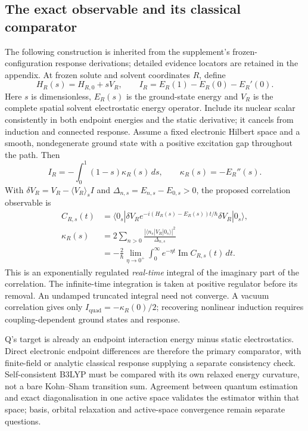 \documentclass{article}
\begin{document}
\subsection{The exact observable and its classical comparator}

The following construction is inherited from the supplement's frozen-configuration response derivations; detailed evidence locators are retained in the appendix. At frozen solute and solvent coordinates $R$, define
\begin{equation*}
H_R(s)=H_{R,0}+sV_R,\qquad I_R=E_R(1)-E_R(0)-E_R'(0).
\end{equation*}
Here $s$ is dimensionless, $E_R(s)$ is the ground-state energy and $V_R$ is the complete spatial solvent electrostatic energy operator. Include its nuclear scalar consistently in both endpoint energies and the static derivative; it cancels from induction and connected response. Assume a fixed electronic Hilbert space and a smooth, nondegenerate ground state with a positive excitation gap throughout the path. Then
\begin{equation*}
I_R=-\int_0^1(1-s)\kappa_R(s)\,ds,\qquad \kappa_R(s)=-E_R''(s).
\end{equation*}
With $\delta V_R=V_R-\langle V_R\rangle_s I$ and $\Delta_{n,s}=E_{n,s}-E_{0,s}>0$, the proposed correlation observable is
\begin{align*}
C_{R,s}(t)&=\langle0_s|\delta V_R e^{-i(H_R(s)-E_R(s))t/\hbar}\delta V_R|0_s\rangle,\\
\kappa_R(s)&=2\sum_{n>0}\frac{|\langle n_s|V_R|0_s\rangle|^2}{\Delta_{n,s}}\\
&=-\frac{2}{\hbar}\lim_{\eta\to0^+}\int_0^\infty e^{-\eta t}\operatorname{Im}C_{R,s}(t)\,dt.
\end{align*}
This is an exponentially regulated \emph{real-time} integral of the imaginary part of the correlation. The infinite-time integration is taken at positive regulator before its removal. An undamped truncated integral need not converge. A vacuum correlation gives only $I_{\mathrm{quad}}=-\kappa_R(0)/2$; recovering nonlinear induction requires coupling-dependent ground states and response.

Q's target is already an endpoint interaction energy minus static electrostatics. Direct electronic endpoint differences are therefore the primary comparator, with finite-field or analytic classical response supplying a separate consistency check. Self-consistent B3LYP must be compared with its own relaxed energy curvature, not a bare Kohn--Sham transition sum. Agreement between quantum estimation and exact diagonalisation in one active space validates the estimator within that space; basis, orbital relaxation and active-space convergence remain separate questions.
\end{document}
